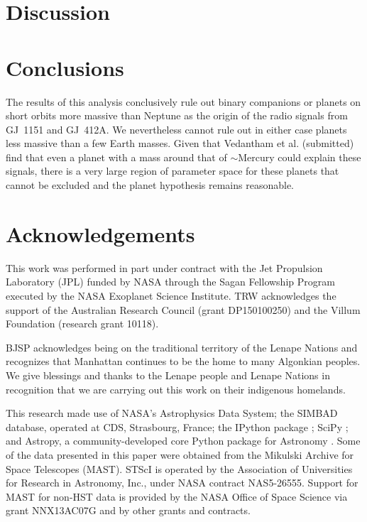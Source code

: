\documentclass[modern]{aastex62}
\begin{document}
\section{Discussion}
\label{sec:discussion}

\section{Conclusions}
\label{sec:conclusions}

The results of this analysis conclusively rule out binary companions or planets on short orbits more massive than Neptune as the origin of the radio signals from GJ~1151 and GJ~412A. We nevertheless cannot rule out in either case planets less massive than a few Earth masses. Given that Vedantham et al. (submitted) find that even a planet with a mass around that of $\sim$Mercury could explain these signals, there is a very large region of parameter space for these planets that cannot be excluded and the planet hypothesis remains reasonable. 

\section*{Acknowledgements} %

This work was performed in part under contract with the Jet Propulsion Laboratory (JPL) funded by NASA through the Sagan Fellowship Program executed by the NASA Exoplanet Science Institute. TRW acknowledges the support of the Australian Research Council (grant DP150100250) and the Villum Foundation (research grant 10118). 

BJSP acknowledges being on the traditional territory of the Lenape Nations and recognizes that Manhattan continues to be the home to many Algonkian peoples. We give blessings and thanks to the Lenape people and Lenape Nations in recognition that we are carrying out this work on their indigenous homelands.
%

This research made use of NASA's Astrophysics Data System; the SIMBAD database, operated at CDS, Strasbourg, France; the IPython package \citep{PER-GRA:2007}; SciPy \citep{scipy}; and Astropy, a community-developed core Python package for Astronomy \citep{astropy}. Some of the data presented in this paper were obtained from the Mikulski Archive for Space Telescopes (MAST). STScI is operated by the Association of Universities for Research in Astronomy, Inc., under NASA contract NAS5-26555. Support for MAST for non-HST data is provided by the NASA Office of Space Science via grant NNX13AC07G and by other grants and contracts. 








\end{document}

